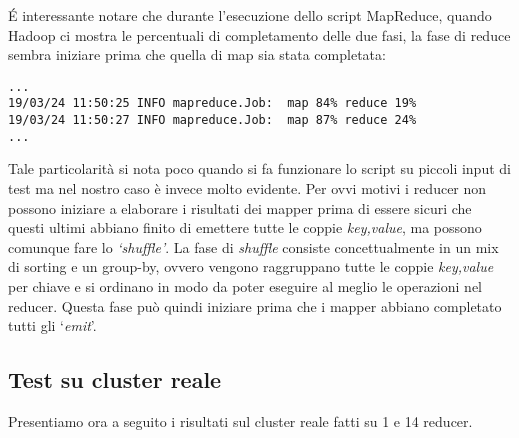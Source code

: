 \documentclass{article}
\newcommand{\MR}{MapReduce}
\begin{document}
\'E interessante notare che durante l'esecuzione dello script \MR{}, quando Hadoop ci mostra le percentuali di completamento delle due fasi, la fase di reduce sembra iniziare prima che quella di map sia stata completata:
\begin{verbatim}
...
19/03/24 11:50:25 INFO mapreduce.Job:  map 84% reduce 19%
19/03/24 11:50:27 INFO mapreduce.Job:  map 87% reduce 24%
...
\end{verbatim}
Tale particolarità si nota poco quando si fa funzionare lo script su piccoli input di test ma nel nostro caso è invece molto evidente. Per ovvi motivi i reducer non possono iniziare a elaborare i risultati dei mapper prima di essere sicuri che questi ultimi abbiano finito di emettere tutte le coppie \textit{\textlangle key,value\textrangle}, ma possono comunque fare lo \textit{`shuffle'}.
La fase di \textit{shuffle} consiste concettualmente in un mix di sorting e un group-by, ovvero vengono raggruppano tutte le coppie \textit{\textlangle key,value\textrangle} per chiave e si ordinano in modo da poter eseguire al meglio le operazioni nel reducer. Questa fase può quindi iniziare prima che i mapper abbiano completato tutti gli `\textit{emit}'.

\subsection{Test su cluster reale}
Presentiamo ora a seguito i risultati sul cluster reale fatti su 1 e 14 reducer.
\end{document}
